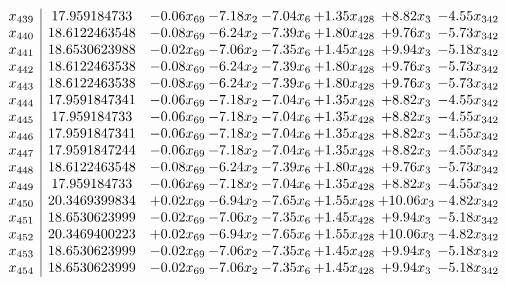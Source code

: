 \documentclass[8pt]{article}
\begin{document}
\[\begin{array}{c| c c@{\hskip 2pt} c@{\hskip 2pt} c@{\hskip 2pt} c@{\hskip 2pt} c@{\hskip 2pt} c@{\hskip 2pt} }
 x_{439}   &  17.959184733 & -0.06 x_{69} & -7.18 x_{2} & -7.04 x_{6} & +  1.35 x_{428} & +  8.82 x_{3} & -4.55 x_{342}\\
 x_{440}   &  18.6122463548 & -0.08 x_{69} & -6.24 x_{2} & -7.39 x_{6} & +  1.80 x_{428} & +  9.76 x_{3} & -5.73 x_{342}\\
 x_{441}   &  18.6530623988 & -0.02 x_{69} & -7.06 x_{2} & -7.35 x_{6} & +  1.45 x_{428} & +  9.94 x_{3} & -5.18 x_{342}\\
 x_{442}   &  18.6122463538 & -0.08 x_{69} & -6.24 x_{2} & -7.39 x_{6} & +  1.80 x_{428} & +  9.76 x_{3} & -5.73 x_{342}\\
 x_{443}   &  18.6122463538 & -0.08 x_{69} & -6.24 x_{2} & -7.39 x_{6} & +  1.80 x_{428} & +  9.76 x_{3} & -5.73 x_{342}\\
 x_{444}   &  17.9591847341 & -0.06 x_{69} & -7.18 x_{2} & -7.04 x_{6} & +  1.35 x_{428} & +  8.82 x_{3} & -4.55 x_{342}\\
 x_{445}   &  17.959184733 & -0.06 x_{69} & -7.18 x_{2} & -7.04 x_{6} & +  1.35 x_{428} & +  8.82 x_{3} & -4.55 x_{342}\\
 x_{446}   &  17.9591847341 & -0.06 x_{69} & -7.18 x_{2} & -7.04 x_{6} & +  1.35 x_{428} & +  8.82 x_{3} & -4.55 x_{342}\\
 x_{447}   &  17.9591847244 & -0.06 x_{69} & -7.18 x_{2} & -7.04 x_{6} & +  1.35 x_{428} & +  8.82 x_{3} & -4.55 x_{342}\\
 x_{448}   &  18.6122463548 & -0.08 x_{69} & -6.24 x_{2} & -7.39 x_{6} & +  1.80 x_{428} & +  9.76 x_{3} & -5.73 x_{342}\\
 x_{449}   &  17.959184733 & -0.06 x_{69} & -7.18 x_{2} & -7.04 x_{6} & +  1.35 x_{428} & +  8.82 x_{3} & -4.55 x_{342}\\
 x_{450}   &  20.3469399834 & +  0.02 x_{69} & -6.94 x_{2} & -7.65 x_{6} & +  1.55 x_{428} & + 10.06 x_{3} & -4.82 x_{342}\\
 x_{451}   &  18.6530623999 & -0.02 x_{69} & -7.06 x_{2} & -7.35 x_{6} & +  1.45 x_{428} & +  9.94 x_{3} & -5.18 x_{342}\\
 x_{452}   &  20.3469400223 & +  0.02 x_{69} & -6.94 x_{2} & -7.65 x_{6} & +  1.55 x_{428} & + 10.06 x_{3} & -4.82 x_{342}\\
 x_{453}   &  18.6530623999 & -0.02 x_{69} & -7.06 x_{2} & -7.35 x_{6} & +  1.45 x_{428} & +  9.94 x_{3} & -5.18 x_{342}\\
 x_{454}   &  18.6530623999 & -0.02 x_{69} & -7.06 x_{2} & -7.35 x_{6} & +  1.45 x_{428} & +  9.94 x_{3} & -5.18 x_{342}\\

\end{array}\]
\end{document}
